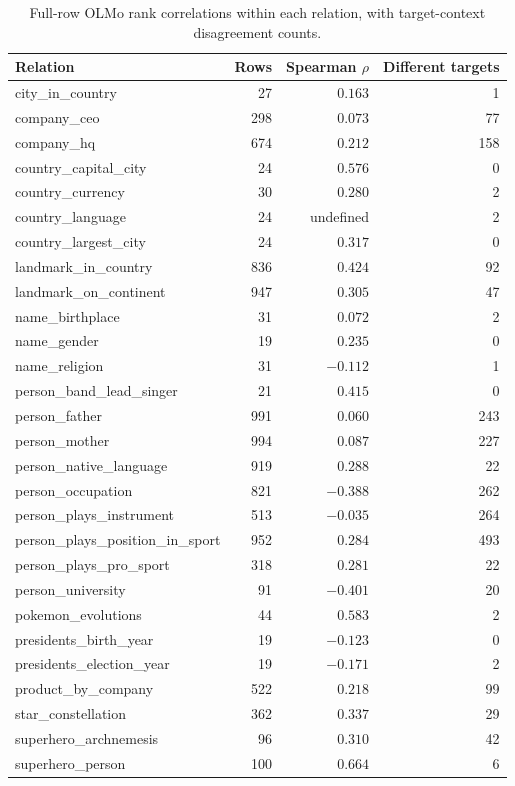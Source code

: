 \begin{table}[t]
\centering\small
\caption{Full-row OLMo rank correlations within each relation, with target-context disagreement counts.}
\label{tab:full-facts}
\begin{tabular}{@{}lrrr@{}}
\toprule
Relation & Rows & Spearman $\rho$ & Different targets \\
\midrule
city\_in\_country & 27 & $0.163$ & 1 \\
company\_ceo & 298 & $0.073$ & 77 \\
company\_hq & 674 & $0.212$ & 158 \\
country\_capital\_city & 24 & $0.576$ & 0 \\
country\_currency & 30 & $0.280$ & 2 \\
country\_language & 24 & undefined & 2 \\
country\_largest\_city & 24 & $0.317$ & 0 \\
landmark\_in\_country & 836 & $0.424$ & 92 \\
landmark\_on\_continent & 947 & $0.305$ & 47 \\
name\_birthplace & 31 & $0.072$ & 2 \\
name\_gender & 19 & $0.235$ & 0 \\
name\_religion & 31 & $-0.112$ & 1 \\
person\_band\_lead\_singer & 21 & $0.415$ & 0 \\
person\_father & 991 & $0.060$ & 243 \\
person\_mother & 994 & $0.087$ & 227 \\
person\_native\_language & 919 & $0.288$ & 22 \\
person\_occupation & 821 & $-0.388$ & 262 \\
person\_plays\_instrument & 513 & $-0.035$ & 264 \\
person\_plays\_position\_in\_sport & 952 & $0.284$ & 493 \\
person\_plays\_pro\_sport & 318 & $0.281$ & 22 \\
person\_university & 91 & $-0.401$ & 20 \\
pokemon\_evolutions & 44 & $0.583$ & 2 \\
presidents\_birth\_year & 19 & $-0.123$ & 0 \\
presidents\_election\_year & 19 & $-0.171$ & 2 \\
product\_by\_company & 522 & $0.218$ & 99 \\
star\_constellation & 362 & $0.337$ & 29 \\
superhero\_archnemesis & 96 & $0.310$ & 42 \\
superhero\_person & 100 & $0.664$ & 6 \\
\bottomrule
\end{tabular}

\end{table}
